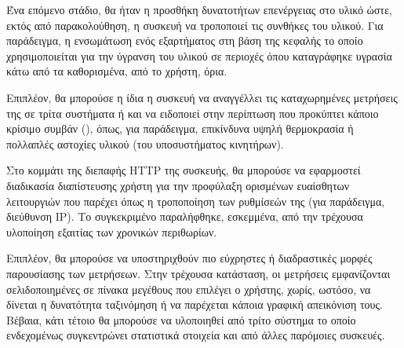Ένα επόμενο στάδιο, θα ήταν η προσθήκη δυνατοτήτων επενέργειας στο υλικό ώστε,
εκτός από παρακολούθηση, η συσκευή να τροποποιεί τις συνθήκες του υλικού. Για
παράδειγμα, η ενσωμάτωση ενός εξαρτήματος στη βάση της κεφαλής το οποίο
χρησιμοποιείται για την ύγρανση του υλικού σε περιοχές όπου καταγράφηκε υγρασία
κάτω από τα καθορισμένα, από το χρήστη, όρια.

Επιπλέον, θα μπορούσε η ίδια η συσκευή να αναγγέλλει τις καταχωρημένες μετρήσεις
της σε τρίτα συστήματα ή και να ειδοποιεί στην περίπτωση που προκύπτει κάποιο
κρίσιμο συμβάν (), όπως, για παράδειγμα, επικίνδυνα υψηλή θερμοκρασία
ή πολλαπλές αστοχίες υλικού (του υποσυστήματος κινητήρων).

Στο κομμάτι της διεπαφής HTTP της συσκευής, θα μπορούσε να εφαρμοστεί διαδικασία
διαπίστευσης χρήστη για την προφύλαξη ορισμένων ευαίσθητων λειτουργιών που
παρέχει όπως η τροποποίηση των ρυθμίσεών της (για παράδειγμα, διεύθυνση IP). Το
συγκεκριμένο παραλήφθηκε, εσκεμμένα, από την τρέχουσα υλοποίηση εξαιτίας των
χρονικών περιθωρίων.

Επιπλέον, θα μπορούσε να υποστηριχθούν πιο εύχρηστες ή διαδραστικές μορφές
παρουσίασης των μετρήσεων. Στην τρέχουσα κατάσταση, οι μετρήσεις εμφανίζονται
σελιδοποιημένες σε πίνακα μεγέθους που επιλέγει ο χρήστης, χωρίς, ωστόσο, να
δίνεται η δυνατότητα ταξινόμηση ή να παρέχεται κάποια γραφική απεικόνιση τους.
Βέβαια, κάτι τέτοιο θα μπορούσε να υλοποιηθεί από τρίτο σύστημα το οποίο
ενδεχομένως συγκεντρώνει στατιστικά στοιχεία και από άλλες παρόμοιες συσκευές.
